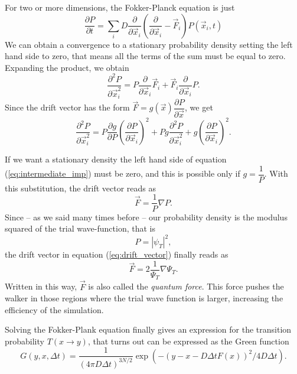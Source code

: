For two or more dimensions, the Fokker-Planck equation is just
\begin{equation}
	\frac{\partial P}{\partial t} = \sum_i D \dfrac{\partial}{\partial \vec{x}_i} \left( \frac{\partial}{\partial \vec{x}_i} - \vec{F}_i \right)P(\vec{x}_i,t)
\end{equation}
We can obtain a convergence to a stationary probability density setting the left hand side to zero, that means all the terms of the sum must be equal to zero. Expanding the product, we obtain
\begin{equation}
	\frac{\partial^2 P}{\partial \vec{x}_i^2} = P \frac{\partial}{\partial \vec{x}_i}\vec{F}_i + \vec{F}_i \frac{\partial}{\partial \vec{x}_i}P.
\end{equation}
Since the drift vector has the form $\vec{F} = g(\vec{x}) \dfrac{\partial P}{\partial \vec{x}}$, we get
\begin{equation}
	\frac{\partial ^2 P}{\partial \vec{x}_i^2 } = P \frac{\partial g}{\partial P} \left( \frac{\partial P}{\partial \vec{x}_i} \right)^2 + Pg \frac{\partial ^2 P}{\partial \vec{x}_i^2} + g \left( \frac{\partial P}{\partial \vec{x}_i} \right)^2.
	\label{eq:intermediate_imp}
\end{equation}

If we want a stationary density the left hand side of equation (\ref{eq:intermediate_imp}) must be zero, and this is possible only if $g = \dfrac{1}{P}$. With this substitution, the drift vector reads as
\begin{equation}
	\vec{F} = \frac{1}{P} \nabla P.
	\label{eq:drift_vector}
\end{equation}
Since -- as we said many times before --  our probability density is the modulus squared of the trial wave-function, that is
\begin{equation}
	P = |\psi_T|^2,
\end{equation}
the drift vector in equation (\ref{eq:drift_vector}) finally reads as
\begin{equation}
	\vec{F} = 2 \frac{1}{\Psi_T} \nabla \Psi_T.
\end{equation}
Written in this way, $\vec{F}$ is also called the \emph{quantum force}. This force pushes the walker in those regions where the trial wave function is larger, increasing the efficiency of the simulation.

Solving the Fokker-Plank equation finally gives an expression for the transition probability $T(x \rightarrow y)$, that turns out can be expressed as the Green function
\begin{equation}
G(y,x, \Delta t) = \dfrac{1}{(4 \pi D \Delta t)^{3N/2}} \exp(-(y - x - D \Delta t F(x))^2 / 4 D \Delta t).
\end{equation}

